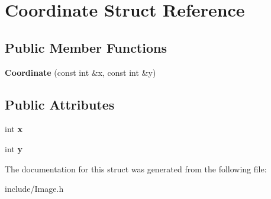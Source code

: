 \hypertarget{structCoordinate}{\section{Coordinate Struct Reference}
\label{structCoordinate}
}
\subsection*{Public Member Functions}
\begin{DoxyCompactItemize}
\item 
\hypertarget{structCoordinate_a7df547dd94d79a46e88d0fb57c2c9e74}{{\bfseries Coordinate} (const int \&x, const int \&y)}\label{structCoordinate_a7df547dd94d79a46e88d0fb57c2c9e74}

\end{DoxyCompactItemize}
\subsection*{Public Attributes}
\begin{DoxyCompactItemize}
\item 
\hypertarget{structCoordinate_ad462d671f1feb865911333e3ff5f0a5d}{int {\bfseries x}}\label{structCoordinate_ad462d671f1feb865911333e3ff5f0a5d}

\item 
\hypertarget{structCoordinate_a5c7d59f0f65ff9371b6c3791f78880aa}{int {\bfseries y}}\label{structCoordinate_a5c7d59f0f65ff9371b6c3791f78880aa}

\end{DoxyCompactItemize}


The documentation for this struct was generated from the following file\-:\begin{DoxyCompactItemize}
\item 
include/Image.\-h\end{DoxyCompactItemize}
